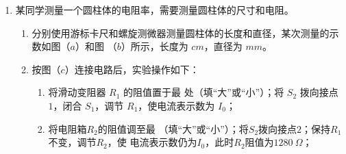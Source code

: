 \begin{enumerate}
\item 
{}
某同学测量一个圆柱体的电阻率，需要测量圆柱体的尺寸和电阻。
\begin{figure}[h!]
\centering
\begin{subfigure}{0.4\linewidth}
\centering
 
\caption{}\label{}
\end{subfigure}
\begin{subfigure}{0.4\linewidth}
\centering
%
  
\caption{}\label{}
\end{subfigure}
\begin{subfigure}{0.4\linewidth}
\centering
 
\caption{}\label{}
\end{subfigure}
\end{figure}

\begin{enumerate}
\item
分别使用游标卡尺和螺旋测微器测量圆柱体的长度和直径，某次测量的示数如图（$ a $）和图 （$ b $）所示，长度为 \underlinegap $ cm $，直径为 \underlinegap $ mm $。



\item 
按图（$ c $）连接电路后，实验操作如下：
\begin{enumerate}
\item
将滑动变阻器 $ R_{1} $ 的阻值置于最 \underlinegap 处（填“大”或“小”）；将 $ S_{2} $ 拨向接点 $ 1 $，闭合 $ S_{1} $，调节
$ R_{1} $，使电流表示数为 $ I_{0} $；


\item 
将电阻箱$ R_{2} $的阻值调至最 \underlinegap （填“大”或“小”）；将$ S_{2} $拨向接点$ 2 $；保持$ R_{1} $不变，调节$ R_{2} $，使
电流表示数仍为$ I_{0} $，此时$ R_{2} $阻值为$ 1280 \ \Omega $；

\end{enumerate}





\end{enumerate}
\end{enumerate}
